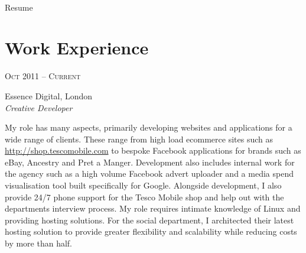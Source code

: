 \documentclass[10pt]{article} %
\begin{document}
\color{text1} %


\par{\\
{\color{headings} Resume\\[15pt]\par}
    

\begin{minipage}[t]{0.5\textwidth}
\vspace{0pt}


\section{Work Experience} 

{\raggedleft\textsc{Oct 2011 -- Current}\par}

{\raggedright\large Essence Digital, London\\
\textit{Creative Developer}\\[5pt]}

\normalsize{My role has many aspects, primarily developing websites and applications for a wide range of clients. 
These range from high load ecommerce sites such as \href{http://shop.tescomobile.com}{http://shop.tescomobile.com} to bespoke Facebook applications for brands such as eBay, Ancestry and Pret a Manger.
Development also includes internal work for the agency such as a high volume Facebook advert uploader and a media spend visualisation tool built specifically for Google.
Alongside development, I also provide 24/7 phone support for the Tesco Mobile shop and help out with the departments interview process.
My role requires intimate knowledge of Linux and providing hosting solutions. 
For the social department, I architected their latest hosting solution to provide greater flexibility and scalability while reducing costs by more than half.
}\\


\end{minipage}}
\end{document}
